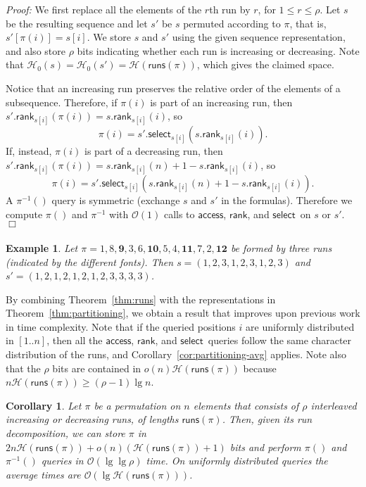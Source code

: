 \documentclass[11pt]{article}
\newtheorem{corollary}[theorem]{Corollary}
\newenvironment{proof}{\textit{Proof:}}{\hfill$\Box$ \paragraph{} }
\newtheorem{example}{Example}
\providecommand{\pii}{\ensuremath{\pi^{-1}}}
\newcommand{\Oh}[1]
    {\ensuremath{\mathcal{O}\left( {#1} \right)}}
\newcommand{\access}
    {\ensuremath{\mathsf{access}}}
\newcommand{\rank}
    {\ensuremath{\mathsf{rank}}}
\newcommand{\select}
    {\ensuremath{\mathsf{select}}}
\newcommand{\runs}
    {\ensuremath{\mathsf{runs}}}
\newcommand{\HH}{\mathcal{H}}
\newcommand{\Ho}{\HH_0}
\begin{document}
\begin{proof}
We first replace all the elements of the $r$th run by $r$, for $1\le r\le\rho$.
Let $s$ be the resulting sequence and let $s'$ be $s$ permuted according to 
$\pi$, that is, \(s' [\pi (i)] = s [i]\).
We store $s$ and $s'$ using the given sequence representation, and also store 
$\rho$ bits indicating whether each run is increasing or decreasing. Note that
$\Ho(s) = \Ho(s') = \HH(\runs(\pi))$, which gives the claimed space.

Notice that an increasing run preserves the relative order of the elements of
a subsequence. Therefore, if \(\pi (i)\) is part of an increasing run, then 
\(s'.\rank_{s [i]} (\pi (i)) = s.\rank_{s [i]} (i)\), so
\[\pi (i) = s'.\select_{s [i]} \left( s.\rank_{s [i]} (i) \right).\]
If, instead, \(\pi (i)\) is part of a decreasing run, then \(s'.\rank_{s [i]} (\pi (i))
= s.\rank_{s [i]} (n) +1 - s.\rank_{s [i]} (i)\), so
\[\pi (i) = s'.\select_{s [i]} \left( s.\rank_{s [i]} (n) +1 - s.\rank_{s [i]} (i) \right).\]
A $\pii()$ query is symmetric (exchange $s$ and $s'$ in the formulas).  
Therefore we compute $\pi()$ and $\pii$ with $\Oh{1}$ calls to \access,
\rank, and \select\ on $s$ or $s'$.
\end{proof}



\begin{example}
Let $\pi = 1,\mathit{8},\mathbf{9},3,\mathit{6},\mathbf{10},5,\mathit{4},
\mathbf{11},7,\mathit{2},\mathbf{12}$ be formed by three runs (indicated by
the different fonts). Then $s = (1,2,3,1,2,3,1,2,3)$ and 
$s'=(1,2,1,2,1,2,1,2,3,3,3,3)$.
\end{example}

By combining Theorem~\ref{thm:runs} with the representations in 
Theorem~\ref{thm:partitioning}, we obtain a result that improves upon previous 
work \cite{BN09,BN11} in time complexity. Note that if the queried positions $i$
are uniformly distributed in $[1..n]$, then all the \access, \rank, and
\select\ queries follow the same character distribution of the runs, and
Corollary~\ref{cor:partitioning-avg} applies.
Note also that the $\rho$ bits are contained in $o(n)\HH(\runs(\pi))$ because
$n\HH(\runs(\pi)) \ge (\rho-1)\lg n$.

\begin{corollary} \label{cor:runs}
  Let $\pi$ be a permutation on $n$ elements that consists of $\rho$
  interleaved increasing or decreasing runs, of lengths $\runs (\pi)$.
Then, given its run decomposition, we can store $\pi$ in 
  \(2 n \HH (\runs (\pi)) + o(n)(\HH (\runs (\pi)) +
  1)\) bits and perform $\pi()$ and $\pii()$ queries in
  $\Oh{\lg \lg \rho}$ time.
  On uniformly distributed queries the average times are
  $\Oh{\lg \HH(\runs(\pi))}$.
\end{corollary}
\end{document}
